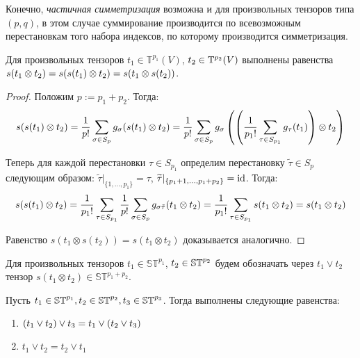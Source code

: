 \begin{note}
	Конечно, \textit{частичная симметризация} возможна и для произвольных тензоров типа $(p, q)$, в этом случае суммирование производится по всевозможным перестановкам того набора индексов, по которому производится симметризация.
\end{note}

\begin{proposition}
	Для произвольных тензоров $t_1 \in \mathbb{T}^{p_1}(V)$, $t_2 \hm\in \mathbb{T}^{p_2}(V)$ выполнены равенства $s(t_1 \otimes t_2) = s(s(t_1) \otimes t_2) \hm= s(t_1 \otimes s(t_2))$.
\end{proposition}

\begin{proof}
	Положим $p := p_1 + p_2$. Тогда:
	\[s(s(t_1) \otimes t_2) = \frac1{p!}\sum_{\sigma \in S_{p}}g_{\sigma}(s(t_1)\hm\otimes t_2) = \frac1{p!}\sum_{\sigma \in S_{p}}g_{\sigma}\left(\left(\frac1{p_1!}\sum_{\tau \in S_{p_1}}g_\tau(t_1)\right)\otimes t_2\right)\]
	
	Теперь для каждой перестановки $\tau \in S_{p_1}$ определим перестановку $\widetilde{\tau} \in S_{p}$ следующим образом: $\widetilde\tau|_{\{1, \dotsc, p_1\}} = \tau$, $\widetilde\tau|_{\{p_1 + 1, \dotsc, p_1 + p_2\}} = \operatorname{id}$. Тогда:
	\[s(s(t_1) \otimes t_2) = \frac1{p_1!}\sum_{\tau \in S_{p_1}}\frac1{p!}\sum_{\sigma \in S_{p}}g_{\sigma\tilde\tau}(t_1 \otimes t_2) =  \frac1{p_1!}\sum_{\tau \in S_{p_1}}s(t_1 \otimes t_2) = s(t_1 \otimes t_2)\qedhere\]
	
	Равенство $s(t_1 \otimes s(t_2)) = s(t_1 \otimes t_2)$ доказывается аналогично.
\end{proof}

\begin{definition}
	Для произвольных тензоров $t_1 \in \mathbb{ST}^{p_1}$, $t_2 \hm\in \mathbb{ST}^{p_2}$ будем обозначать через $t_1 \lor t_2$ тензор $s(t_1 \otimes t_2) \in \mathbb{ST}^{p_1+p_2}$.
\end{definition}

\begin{proposition}
	Пусть $t_1 \in \mathbb{ST}^{p_1}, t_2 \hm\in \mathbb{ST}^{p_2}, t_3 \in \mathbb{ST}^{p_3}$. Тогда выполнены следующие равенства:
	\begin{enumerate}
		\item $(t_1\lor t_2)\hm\lor t_3 = t_1\lor(t_2\lor t_3)$
		
		\item $t_1 \lor t_2 = t_2 \lor t_1$
	\end{enumerate}
\end{proposition}

